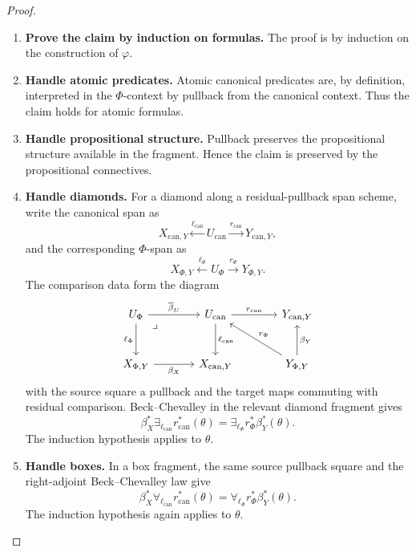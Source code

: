 \begin{proof}
\leavevmode
\begin{enumerate}
  \item \textbf{Prove the claim by induction on formulas.}
  The proof is by induction on the construction of \(\varphi\).

  \item \textbf{Handle atomic predicates.}
  Atomic canonical predicates are, by definition, interpreted in the
  \(\Phi\)-context by pullback from the canonical context.  Thus the claim
  holds for atomic formulas.

  \item \textbf{Handle propositional structure.}
  Pullback preserves the propositional structure available in the fragment.
  Hence the claim is preserved by the propositional connectives.

  \item \textbf{Handle diamonds.}
  For a diamond along a residual-pullback span scheme, write the canonical
  span as
  \[
    X_{\mathrm{can},Y}
    \xleftarrow{\ell_{\mathrm{can}}}
    U_{\mathrm{can}}
    \xrightarrow{r_{\mathrm{can}}}
    Y_{\mathrm{can},Y},
  \]
  and the corresponding \(\Phi\)-span as
  \[
    X_{\Phi,Y}
    \xleftarrow{\ell_{\Phi}}
    U_{\Phi}
    \xrightarrow{r_{\Phi}}
    Y_{\Phi,Y}.
  \]
  The comparison data form the diagram
  \[
  \begin{tikzcd}[column sep=large,row sep=large]
  U_{\Phi}
    \arrow[r, "\overline{\beta}_U"]
    \arrow[d, "\ell_{\Phi}"']
    \arrow[dr, phantom, very near start, "\lrcorner"]
  &
  U_{\mathrm{can}}
    \arrow[d, "\ell_{\mathrm{can}}"]
    \arrow[r, "r_{\mathrm{can}}"]
  &
  Y_{\mathrm{can},Y}
  \\
  X_{\Phi,Y}
    \arrow[r, "\beta_X"']
  &
  X_{\mathrm{can},Y}
  &
  Y_{\Phi,Y}
    \arrow[u, "\beta_Y"']
    \arrow[ul, "r_{\Phi}"']
  \end{tikzcd}
  \]
  with the source square a pullback and the target maps commuting with
  residual comparison.  Beck--Chevalley in the relevant diamond fragment
  gives
  \[
    \beta_X^*
    \exists_{\ell_{\mathrm{can}}}
    r_{\mathrm{can}}^*(\theta)
    =
    \exists_{\ell_{\Phi}}
    r_{\Phi}^*
    \beta_Y^*(\theta).
  \]
  The induction hypothesis applies to \(\theta\).

  \item \textbf{Handle boxes.}
  In a box fragment, the same source pullback square and the right-adjoint
  Beck--Chevalley law give
  \[
    \beta_X^*
    \forall_{\ell_{\mathrm{can}}}
    r_{\mathrm{can}}^*(\theta)
    =
    \forall_{\ell_{\Phi}}
    r_{\Phi}^*
    \beta_Y^*(\theta).
  \]
  The induction hypothesis again applies to \(\theta\).


\end{enumerate}
\end{proof}
